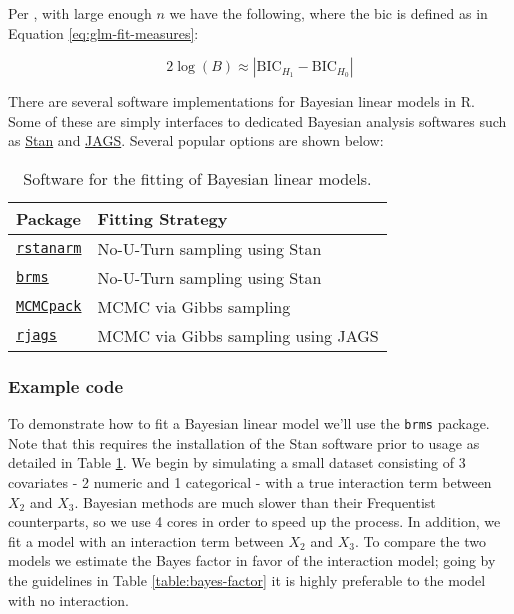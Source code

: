 \documentclass{report}
\begin{document}
Per \cite[Chapter~10.1]{wakefield_bayesian_2013}, with large enough $n$ we have the following, where the \gls{bic} is defined as in Equation \ref{eq:glm-fit-measures}:

\begin{equation}\label{eq:ols-bayes-bf-3}
    2\log(B) \approx \left|\text{BIC}_{H_1} - \text{BIC}_{H_0}\right|
\end{equation}

There are several software implementations for Bayesian linear models in R. Some of these are simply interfaces to dedicated Bayesian analysis softwares such as \href{https://mc-stan.org}{Stan} and \href{https://mcmc-jags.sourceforge.io}{JAGS}. Several popular options are shown below:

\begin{table}[h!]
\centering
\begin{tabular}{||l l||}
  \hline
  \textbf{Package} & \textbf{Fitting Strategy} \\ [0.5ex]
  \hline\hline
  \href{https://cran.r-project.org/web/packages/rstanarm/index.html}{\texttt{rstanarm}} & No-U-Turn sampling using Stan \\
  \hline 
  \href{https://cran.r-project.org/web/packages/brms/index.html}{\texttt{brms}} & No-U-Turn sampling using Stan \\
  \hline 
  \href{https://cran.r-project.org/web/packages/MCMCpack/index.html}{\texttt{MCMCpack}} & MCMC via Gibbs sampling \\
  \hline 
  \href{https://cran.r-project.org/web/packages/rjags/index.html}{\texttt{rjags}} & MCMC via Gibbs sampling using JAGS \\
  \hline 
\end{tabular}
\caption{Software for the fitting of Bayesian linear models.}
\label{table:bayes-software}
\end{table}

\subsubsection{Example code}

To demonstrate how to fit a Bayesian linear model we'll use the \texttt{brms} package. Note that this requires the installation of the Stan software prior to usage as detailed in Table \ref{table:bayes-software}. We begin by simulating a small dataset consisting of 3 covariates - 2 numeric and 1 categorical - with a true interaction term between $X_2$ and $X_3$. Bayesian methods are much slower than their Frequentist counterparts, so we use 4 cores in order to speed up the process. In addition, we fit a model with an interaction term between $X_2$ and $X_3$. To compare the two models we estimate the Bayes factor in favor of the interaction model; going by the guidelines in Table \ref{table:bayes-factor} it is highly preferable to the model with no interaction. 
\end{document}
